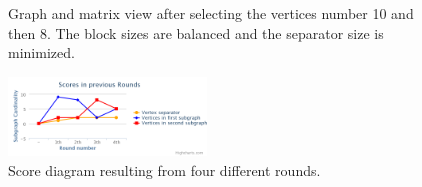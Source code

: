 \documentclass[12pt, twoside]{book}
\begin{document}
\begin{figure}
\centering
{}%
\caption{Graph and matrix view after selecting the vertices number 10 and then 8. The block sizes are balanced and the separator size is minimized.}
\label{selected810}
\end{figure}

\begin{figure}
\centering
\includegraphics[width=0.47\textwidth]{diagram}
\caption{Score diagram resulting from four different rounds.}
\label{diagram}
\end{figure}
\end{document}

